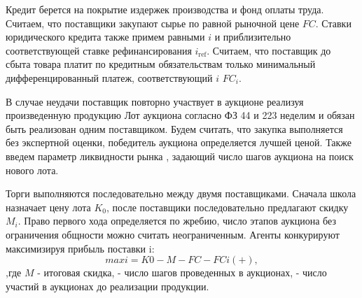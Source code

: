 Кредит берется на покрытие издержек производства и фонд оплаты труда. Считаем, что поставщики закупают сырье по равной рыночной цене $FC$.  Ставки юридического кредита также примем равными $i$ и приблизительно соответствующей ставке рефинансирования $i_{\text{ref}}$. Считаем, что поставщик до сбыта товара платит по кредитным обязательствам только минимальный дифференцированный платеж, соответствующий $i$ $FC_i$.

В случае неудачи поставщик повторно участвует в аукционе реализуя произведенную продукцию
Лот аукциона согласно ФЗ 44 и 223 неделим и обязан быть реализован одним поставщиком. Будем считать, что закупка выполняется без экспертной оценки, победитель аукциона определяется лучшей ценой.  Также введем параметр ликвидности рынка , задающий число шагов аукциона на поиск нового лота.

Торги выполняются последовательно между двумя поставщиками. Сначала школа назначает цену лота $K_0$, после поставщики последовательно предлагают скидку  $M_i$.  Право первого хода определяется по жребию, число этапов аукциона без ограничения общности можно считать неограниченным. Агенты конкурируют максимизируя  прибыль поставки i:
$$
    max i= K0-M -FC -FC i (+ ), 
$$
,где $M$ - итоговая скидка,  - число шагов проведенных в аукционах,  - число участий в  аукционах  до реализации продукции.